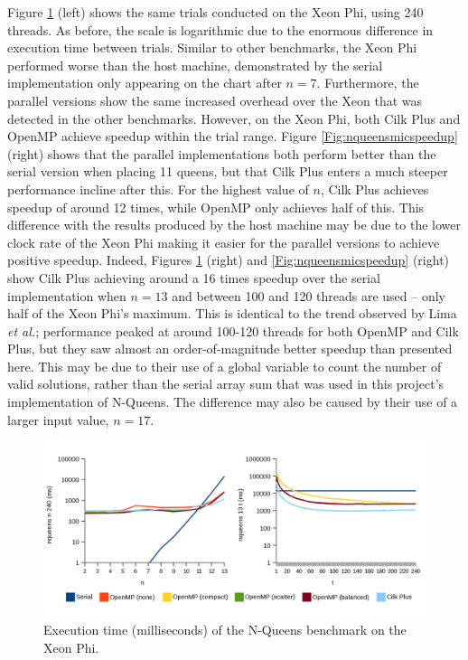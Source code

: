 \documentclass{report}
\begin{document}
Figure \ref{Fig:nqueensmictime} (left) shows the same trials conducted on the Xeon Phi, using 240 threads. As before, the scale is logarithmic due to the enormous difference in execution time between trials. Similar to other benchmarks, the Xeon Phi performed worse than the host machine, demonstrated by the serial implementation only appearing on the chart after \(n=7\). Furthermore, the parallel versions show the same increased overhead over the Xeon that was detected in the other benchmarks. However, on the Xeon Phi, both Cilk Plus and OpenMP achieve speedup within the trial range. Figure \ref{Fig:nqueensmicspeedup} (right) shows that the parallel implementations both perform better than the serial version when placing 11 queens, but that Cilk Plus enters a much steeper performance incline after this. For the highest value of \(n\), Cilk Plus achieves speedup of around 12 times, while OpenMP only achieves half of this. This difference with the results produced by the host machine may be due to the lower clock rate of the Xeon Phi making it easier for the parallel versions to achieve positive speedup. Indeed, Figures \ref{Fig:nqueensmictime} (right) and \ref{Fig:nqueensmicspeedup} (right) show Cilk Plus achieving around a 16 times speedup over the serial implementation when \(n=13\) and between 100 and 120 threads are used -- only half of the Xeon Phi's maximum. This is identical to the trend observed by Lima \textit{et al.}\cite{Lima13}; performance peaked at around 100-120 threads for both OpenMP and Cilk Plus, but they saw almost an order-of-magnitude better speedup than presented here. This may be due to their use of a global variable to count the number of valid solutions, rather than the serial array sum that was used in this project's implementation of N-Queens. The difference may also be caused by their use of a larger input value, \(n=17\).
\noindent
\begin{figure}[t!]
	\includegraphics[width=\linewidth]{../../charts/mic/nqueens_time}
	\caption{Execution time (milliseconds) of the N-Queens benchmark on the Xeon Phi.}
	\label{Fig:nqueensmictime}
\end{figure}
\end{document}
